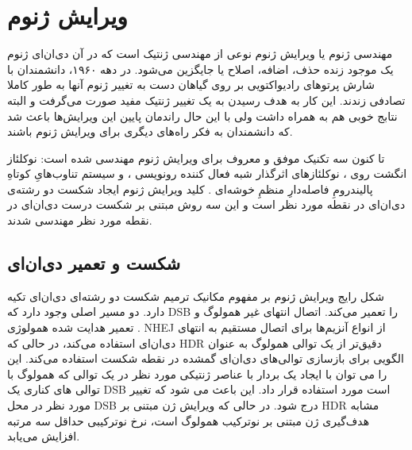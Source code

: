 \documentclass[12pt,a4paper,BCOR=.7cm,headsepline,bibliography=totoc]{report}
\begin{document}
\section{ویرایش ژنوم}
مهندسی ژنوم یا ویرایش ژنوم نوعی از مهندسی ژنتیک است که در آن دی‌ان‌ای ژنوم یک موجود زنده حذف، اضافه، اصلاح یا جایگزین می‌شود. در دهه ۱۹۶۰، دانشمندان با شارش پرتو‌های رادیواکتویی بر روی گیاهان دست به تغییر ژنوم‌ آنها به طور کاملا تصادفی زندند. این کار به هدف رسیدن به یک تغییر ژنتیک مفید صورت می‌گرفت و البته نتابج خوبی هم به همراه داشت ولی با این حال راندمان پایین این ویرایش‌ها باعث شد که دانشمندان به فکر راه‌های دیگری برای ویرایش ژنوم باشند.

تا کنون سه تکنیک موفق و معروف برای ویرایش ژنوم مهندسی شده است:
 نوکلئاز انگشت روی 
، نوکلئازهای اثرگذار شبه فعال کننده رونویسی 
، و سیستم تناوب‌هایِ کوتاهِ پالیندرومِ فاصله‌دارِ منظمِ خوشه‌ای
. 
کلید ویرایش ژنوم ایجاد شکست دو رشته‌ی دی‌ان‌ای در نقطه مورد نظر است و این سه روش مبتنی بر شکست درست دی‌ان‌ای در نقطه مورد نظر مهندسی شدند.
\subsection{ شکست و تعمیر دی‌ان‌ای}

شکل رایج ویرایش ژنوم بر مفهوم مکانیک ترمیم شکست دو رشته‌ای دی‌ان‌ای
تکیه دارد. دو مسیر اصلی وجود دارد که DSB را تعمیر می‌کند. اتصال انتهای غیر همولوگ
  و تعمیر هدایت شده همولوژی
   . NHEJ از انواع آنزیم‌ها برای اتصال مستقیم به انتهای دی‌ان‌ای استفاده می‌کند، در حالی که HDR دقیق‌تر از یک توالی همولوگ به عنوان الگویی برای بازسازی توالی‌های دی‌ان‌ای گمشده در نقطه شکست استفاده می‌کند. این را می توان با ایجاد یک بردار با عناصر ژنتیکی مورد نظر در یک توالی که همولوگ با توالی های کناری یک DSB است مورد استفاده قرار داد. این باعث می شود که تغییر مورد نظر در محل DSB درج شود. در حالی که ویرایش ژن مبتنی بر HDR مشابه هدف‌گیری ژن مبتنی بر نوترکیب همولوگ است، نرخ نوترکیبی حداقل سه مرتبه افزایش می‌یابد.
\end{document}
